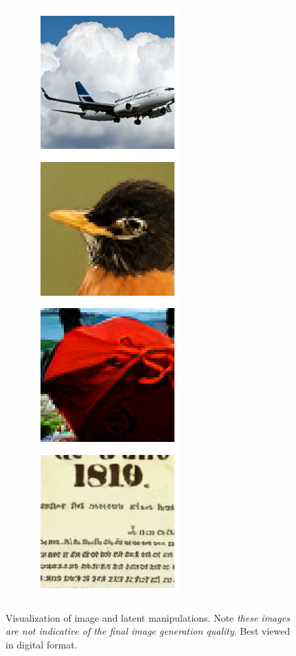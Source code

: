 \documentclass{article} %
\begin{document}
\begin{figure}[h]
\begin{subfigure}[t]{0.16\columnwidth}
\end{subfigure}
\begin{subfigure}[t]{0.16\columnwidth}
\includegraphics[width=1\columnwidth]{figures/latents/vae.png}\caption{}
\end{subfigure}
\caption{Visualization of image and latent manipulations. Note \emph{these images are not indicative of the final image generation quality}. Best viewed in digital format.}
\label{fig:manipulation}
\end{figure}
\end{document}
